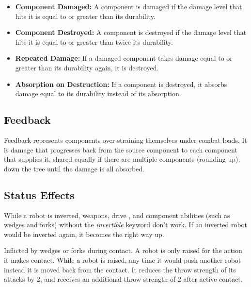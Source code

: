 \documentclass[11pt,a4paper]{article}
\newcommand{\inlineIcon}[1]{\raisebox{-0.22ex}{\resizebox{!}{1.15em}{#1}}}
\begin{document}
\begin{itemize}
  \item \textbf{Component Damaged:} A component is damaged if the damage level that hits it is equal to or greater than its durability.
  \item \textbf{Component Destroyed:} A component is destroyed if the damage level that hits it is equal to or greater than twice its durability.
  \item \textbf{Repeated Damage:} If a damaged component takes damage equal to or greater than its durability again, it is destroyed.
  \item \textbf{Absorption on Destruction:} If a component is destroyed, it absorbs damage equal to its durability instead of its absorption.
\end{itemize}

\subsection{Feedback}

Feedback represents components over-straining themselves under combat loads. It is damage that progresses back from the source component 
to each component that supplies it, shared equally if there are multiple components (rounding up), down the tree until the damage is all absorbed.

\subsection{Status Effects}

\begin{description}[leftmargin=!, labelwidth=2.5cm, font=\bfseries\color{primaryDark}]
  \item[Inverted:] While a robot is inverted, weapons, drive \inlineIcon{\resourceM}, and component abilities (such as wedges and forks) without the \textit{invertible} keyword don't work. If an inverted robot would be inverted again, it becomes the right way up.
  \item[Raised:] Inflicted by wedges or forks during contact. A robot is only raised for the action it makes contact. While a robot is raised, any time it would push another robot instead it is moved back from the contact. It reduces the throw strength of its attacks by 2, and receives an additional throw strength of 2 after active contact.
\end{description}
\end{document}
